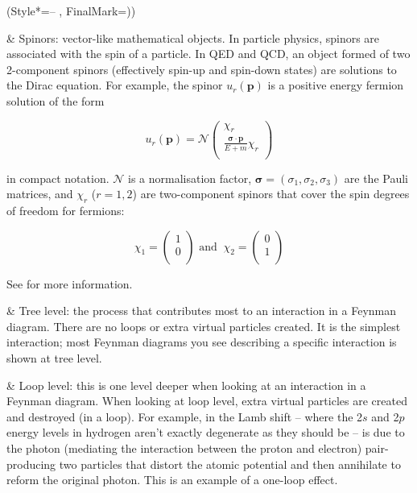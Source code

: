 \begin{easylist}[itemize]
\ListProperties(Style*=-- , FinalMark={)})

& Spinors: vector-like mathematical objects. In particle physics, spinors are associated with the spin of a particle. In QED and QCD, an object formed of two 2-component spinors (effectively spin-up and spin-down states) are solutions to the Dirac equation. For example, the spinor $u_r (\mathbf{p})$ is a positive energy fermion solution of the form

\begin{equation}
u_r (\mathbf{p}) = \mathcal{N}
\begin{pmatrix}
\chi_r \\
\frac{ \boldsymbol{\sigma} \cdot \mathbf{p} }{ E + m } \chi_r \\
\end{pmatrix}
\end{equation}

in compact notation. $\mathcal{N}$ is a normalisation factor, $\boldsymbol{\sigma} = (\sigma_1, \sigma_2, \sigma_3)$ are the Pauli matrices, and $\chi_r$ ($r = 1, 2$) are two-component spinors that cover the spin degrees of freedom for fermions:

\begin{equation}
\chi_1 = 
\begin{pmatrix}
1 \\
0 \\
\end{pmatrix}
\textrm{ and } \ 
\chi_2 = 
\begin{pmatrix}
0 \\
1 \\
\end{pmatrix}
\end{equation}

See \cite{Steane:2013wra} for more information.

& Tree level: the process that contributes most to an interaction in a Feynman diagram. There are no loops or extra virtual particles created. It is the simplest interaction; most Feynman diagrams you see describing a specific interaction is shown at tree level.

& Loop level: this is one level deeper when looking at an interaction in a Feynman diagram. When looking at loop level, extra virtual particles are created and destroyed (in a loop). For example, in the Lamb shift -- where the 2$s$ and 2$p$ energy levels in hydrogen aren't exactly degenerate as they should be -- is due to the photon (mediating the interaction between the proton and electron) pair-producing two particles that distort the atomic potential and then annihilate to reform the original photon. This is an example of a one-loop effect.


\end{easylist}
